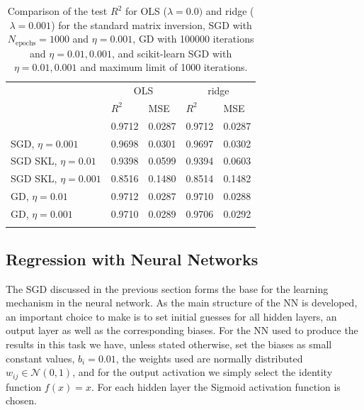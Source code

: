 \documentclass{emulateapj}
\begin{document}
\begin{table}[!htb]
\begin{center}
\caption{\scriptsize Comparison of the test $R^2$ for OLS ($\lambda=0.0) $ and ridge ($\lambda=0.001$) for the standard matrix inversion, SGD with $N_{\mathrm{epochs}}=1000$ and $\eta=0.001$, GD with 100000 iterations and $\eta=0.01,0.001$, and scikit-learn SGD with $\eta=0.01,0.001$ and maximum limit of 1000 iterations. }
\label{tab:OLS vs ridge}  
\begin{tabular}{lllll}
\cline{2-5}\noalign{\smallskip}\cline{2-5}\noalign{\smallskip}
& \multicolumn{2}{c}{OLS} & \multicolumn{2}{c}{ridge} \\ \cline{2-5}\noalign{\smallskip} 
& $R^2$ & MSE & $R^2$ & MSE \\ \hline\noalign{\smallskip}
\multicolumn{1}{l|}{Mat.inv.} & 0.9712 & 0.0287 & 0.9712 & 0.0287\\
\multicolumn{1}{l|}{SGD, $\eta=0.001$} & 0.9698 & 0.0301 & 0.9697 & 0.0302\\
\multicolumn{1}{l|}{SGD SKL, $\eta=0.01$} & 0.9398  & 0.0599 & 0.9394 & 0.0603\\
\multicolumn{1}{l|}{SGD SKL, $\eta=0.001$} & 0.8516  & 0.1480 & 0.8514 & 0.1482\\
\multicolumn{1}{l|}{GD, $\eta=0.01$} & 0.9712 & 0.0287 & 0.9710 & 0.0288\\
\multicolumn{1}{l|}{GD, $\eta=0.001$} & 0.9710 & 0.0289 & 0.9706 & 0.0292\\ \noalign{\smallskip}\hline
\end{tabular}
\end{center}
\end{table}

\subsection{Regression with Neural Networks}
\label{subsec:regression neural network}

The SGD discussed in the previous section forms the base for the learning mechanism in the neural network. As the main structure of the NN is developed, an important choice to make is to set initial guesses for all hidden layers, an output layer as well as the corresponding biases. For the NN used to produce the results in this task we have, unless stated otherwise, set the biases as small constant values, $b_i=0.01$, the weights used are normally distributed $w_{ij}\in\mathcal{N}(0,1)$, and for the output activation we simply select the identity function $f(x) = x$. For each hidden layer the Sigmoid activation function is chosen.
\end{document}
